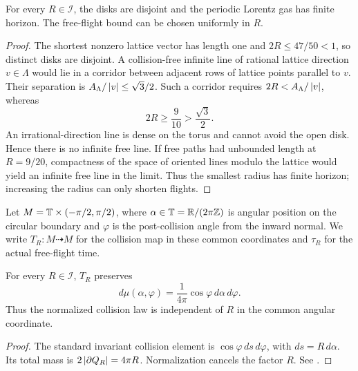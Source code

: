 \begin{theorem}\label{thm:finite-horizon}
For every $R\in\mathcal I$, the disks are disjoint and the periodic Lorentz
gas has finite horizon.  The free-flight bound can be chosen uniformly in
$R$.
\end{theorem}
\begin{proof}
The shortest nonzero lattice vector has length one and
$2R\le 47/50<1$, so distinct disks are disjoint.  A collision-free infinite
line of rational lattice direction $v\in\Lambda$ would lie in a corridor
between adjacent rows of lattice points parallel to $v$.  Their separation is
$A_\Lambda/\left\lvert v\right\rvert\le\sqrt3/2$.  Such a corridor requires
$2R<A_\Lambda/\left\lvert v\right\rvert$, whereas
\[
 2R\ge\frac9{10}>\frac{\sqrt3}{2}.
\]
An irrational-direction line is dense on the torus and cannot avoid the open
disk.  Hence there is no infinite free line.  If free paths had unbounded
length at $R=9/20$, compactness of the space of oriented lines modulo the
lattice would yield an infinite free line in the limit.  Thus the smallest
radius has finite horizon; increasing the radius can only shorten flights.
\end{proof}

Let $M=\mathbb T\times(-\pi/2,\pi/2)$, where $\alpha\in\mathbb T=\mathbb R/(2\pi\mathbb Z)$ is angular
position on the circular boundary and $\varphi$ is the post-collision angle
from the inward normal.  We write $T_R:M\dashrightarrow M$ for the collision
map in these common coordinates and $\tau_R$ for the actual free-flight time.

\begin{proposition}\label{prop:liouville}
For every $R\in\mathcal I$, $T_R$ preserves
\[
 d\mu(\alpha,\varphi)=\frac1{4\pi}\cos\varphi\,d\alpha\,d\varphi.
\]
Thus the normalized collision law is independent of $R$ in the common angular
coordinate.
\end{proposition}
\begin{proof}
The standard invariant collision element is
$\cos\varphi\,ds\,d\varphi$, with $ds=R\,d\alpha$.  Its total mass is
$2\left\lvert \partial Q_R\right\rvert=4\pi R$.  Normalization cancels the factor $R$.
See \cite{ChernovMarkarian2006}.
\end{proof}


